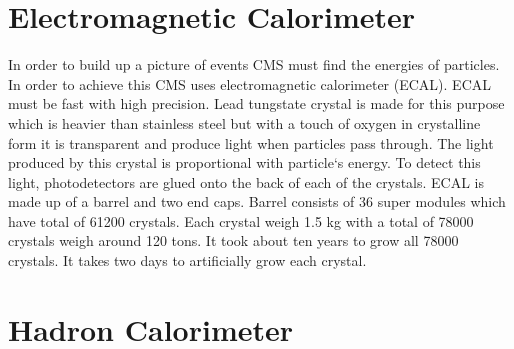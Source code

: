 \documentclass[11pt, oneside]{article}   	%
\begin{document}
\section{Electromagnetic Calorimeter}
In order to build up a picture of events CMS must find the energies of particles. In order to achieve this CMS uses electromagnetic calorimeter (ECAL). ECAL must be fast with high precision. 
Lead tungstate crystal is made for this purpose which is heavier than stainless steel but with a touch of oxygen in crystalline form it is transparent and produce light when particles
pass through. The light produced by this crystal is proportional with particle`s energy. To detect this light, photodetectors are glued onto the back of each of the crystals. ECAL is made up of a barrel
and two end caps. Barrel consists of 36 super modules which have total of 61200 crystals. Each crystal weigh 1.5 kg with a total of 78000 crystals weigh around 120 tons. It took about ten years to grow
all 78000 crystals. It takes two days to artificially grow each crystal.

\section{Hadron Calorimeter}
\end{document}
